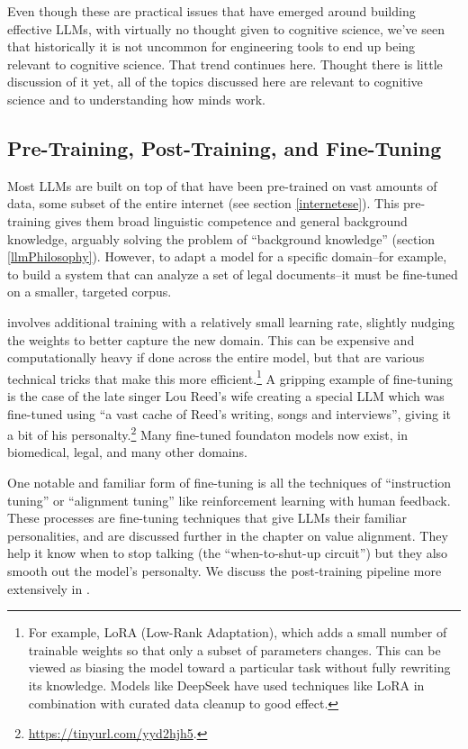 Even though these are practical issues that have emerged around building
effective LLMs, with virtually no thought given to cognitive science, we've
seen that historically it is not uncommon for engineering tools to end up being
relevant to cognitive science. That trend continues here. Thought there is
little discussion of it yet, all of the topics discussed here are relevant to
cognitive science and to understanding how minds work. 

\subsection{Pre-Training, Post-Training, and Fine-Tuning}

Most LLMs are built on top of  that have been
pre-trained on vast amounts of data, some subset of the entire internet (see
section \ref{internetese}). This pre-training gives them broad linguistic
competence and general background knowledge, arguably solving the problem of
``background knowledge'' (section \ref{llmPhilosophy}). However, to adapt a
model for a specific domain--for example, to build a system that can analyze a
set of legal documents--it must be fine-tuned on a smaller, targeted corpus.

 involves additional training with a relatively small
learning rate, slightly nudging the weights to better capture the new domain.
This can be expensive and computationally heavy if done across the entire
model, but that are various technical tricks that make this more
efficient.\footnote{For example, LoRA (Low-Rank Adaptation), which adds a small
number of trainable weights so that only a subset of parameters changes. This
can be viewed as biasing the model toward a particular task without fully
rewriting its knowledge. Models like DeepSeek have used techniques like LoRA in
combination with curated data cleanup to good effect.} A gripping example of
fine-tuning is the case of the late singer Lou Reed's wife creating a special
LLM which was fine-tuned using ``a vast cache of Reed's writing, songs and
interviews'', giving it a bit of his
personalty.\footnote{\url{https://tinyurl.com/yyd2hjh5}.}  Many fine-tuned
foundaton models now exist, in biomedical, legal, and many other domains.

One notable and familiar form of fine-tuning is all the techniques of
``instruction tuning'' or ``alignment tuning'' like reinforcement learning with
human feedback.  These processes are fine-tuning techniques that give LLMs
their familiar personalities, and are discussed further in the chapter on value
alignment. They help it know when to stop talking (the ``when-to-shut-up
circuit'') but they also smooth out the model's personalty. We discuss the
post-training pipeline more extensively in .

